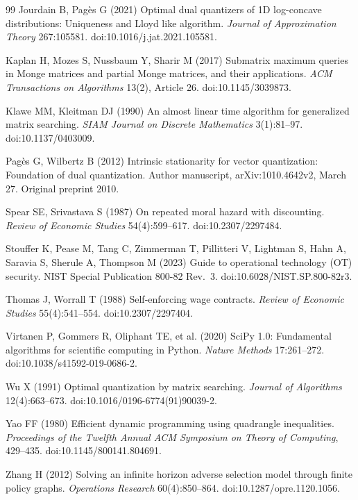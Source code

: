 \begin{thebibliography}{99}
Jourdain B, Pag\`es G (2021) Optimal dual quantizers of 1D log-concave distributions: Uniqueness and Lloyd like algorithm. \emph{Journal of Approximation Theory} 267:105581. doi:10.1016/j.jat.2021.105581.

Kaplan H, Mozes S, Nussbaum Y, Sharir M (2017) Submatrix maximum queries in Monge matrices and partial Monge matrices, and their applications. \emph{ACM Transactions on Algorithms} 13(2), Article 26. doi:10.1145/3039873.

Klawe MM, Kleitman DJ (1990) An almost linear time algorithm for generalized matrix searching. \emph{SIAM Journal on Discrete Mathematics} 3(1):81--97. doi:10.1137/0403009.

Pag\`es G, Wilbertz B (2012) Intrinsic stationarity for vector quantization: Foundation of dual quantization. Author manuscript, arXiv:1010.4642v2, March 27. Original preprint 2010.

Spear SE, Srivastava S (1987) On repeated moral hazard with discounting. \emph{Review of Economic Studies} 54(4):599--617. doi:10.2307/2297484.

Stouffer K, Pease M, Tang C, Zimmerman T, Pillitteri V, Lightman S, Hahn A, Saravia S, Sherule A, Thompson M (2023) Guide to operational technology (OT) security. NIST Special Publication 800-82 Rev.~3. doi:10.6028/NIST.SP.800-82r3.

Thomas J, Worrall T (1988) Self-enforcing wage contracts. \emph{Review of Economic Studies} 55(4):541--554. doi:10.2307/2297404.

Virtanen P, Gommers R, Oliphant TE, et al. (2020) SciPy 1.0: Fundamental algorithms for scientific computing in Python. \emph{Nature Methods} 17:261--272. doi:10.1038/s41592-019-0686-2.

Wu X (1991) Optimal quantization by matrix searching. \emph{Journal of Algorithms} 12(4):663--673. doi:10.1016/0196-6774(91)90039-2.

Yao FF (1980) Efficient dynamic programming using quadrangle inequalities. \emph{Proceedings of the Twelfth Annual ACM Symposium on Theory of Computing}, 429--435. doi:10.1145/800141.804691.

Zhang H (2012) Solving an infinite horizon adverse selection model through finite policy graphs. \emph{Operations Research} 60(4):850--864. doi:10.1287/opre.1120.1056.
\end{thebibliography}
